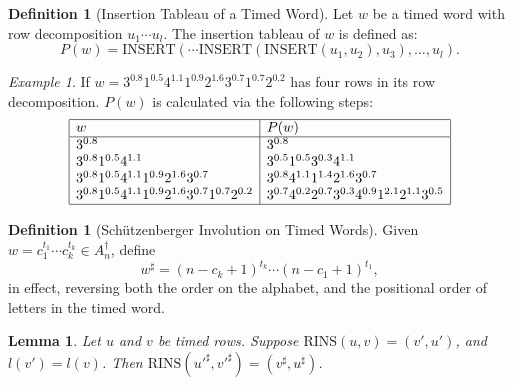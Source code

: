 \documentclass[10pt]{amsproc}
\newtheorem{lemma}[theorem]{Lemma}
\theoremstyle{definition}
\newtheorem{definition}[theorem]{Definition}
\theoremstyle{remark}
\newtheorem{example}[theorem]{Example}
\newcommand{\rowins}{\mathrm{RINS}}
\newcommand{\ins}{\mathrm{INSERT}}
\begin{document}
\begin{definition}
  [Insertion Tableau of a Timed Word]
  Let $w$ be a timed word with row decomposition $u_1\dotsb u_l$.
  The insertion tableau of $w$ is defined as:
  \begin{displaymath}
    P(w) = \ins(\dotsb\ins(\ins(u_1, u_2),u_3),\dotsc,u_l).
  \end{displaymath}
\end{definition}
\begin{example}
  If $w=3^{0.8}1^{0.5}4^{1.1}1^{0.9}2^{1.6}3^{0.7}1^{0.7}2^{0.2}$ has four rows in its row decomposition.
  $P(w)$ is calculated via the following steps:
  \begin{displaymath}
    \begin{array}{|l|l|}
      \hline
      w & P(w)\\
      \hline
      3^{0.8} & 3^{0.8}\\
      3^{0.8}1^{0.5}4^{1.1} & 3^{0.5}1^{0.5}3^{0.3}4^{1.1}\\
      3^{0.8}1^{0.5}4^{1.1}1^{0.9}2^{1.6}3^{0.7} & 3^{0.8}4^{1.1}1^{1.4}2^{1.6}3^{0.7}\\
      3^{0.8}1^{0.5}4^{1.1}1^{0.9}2^{1.6}3^{0.7}1^{0.7}2^{0.2} & 3^{0.7}4^{0.2}2^{0.7}3^{0.3}4^{0.9}1^{2.1}2^{1.1}3^{0.5}\\
      \hline
    \end{array}
  \end{displaymath}
\end{example}
\begin{definition}
  [Sch\"utzenberger Involution on Timed Words]
  \label{definition:schuetzenberger-involution}
  Given $w=c_1^{t_1}\dotsb c_k^{t_k}\in A_n^\dagger$, define
  \begin{equation}
    \label{eq:sharp}
    w^\sharp = (n-c_k+1)^{t_k} \dotsb (n-c_1+1)^{t_1},
  \end{equation}
  in effect, reversing both the order on the alphabet, and the positional order of letters in the timed word.
\end{definition}
\begin{lemma}
  \label{lemma:reverse-row-insertion}
  Let $u$ and $v$ be timed rows.
  Suppose $\rowins(u,v)=(v',u')$, and $l(v')=l(v)$.
  Then $\rowins({u'}^\sharp,{v'}^\sharp)=(v^\sharp,u^\sharp)$.
\end{lemma}
\end{document}
